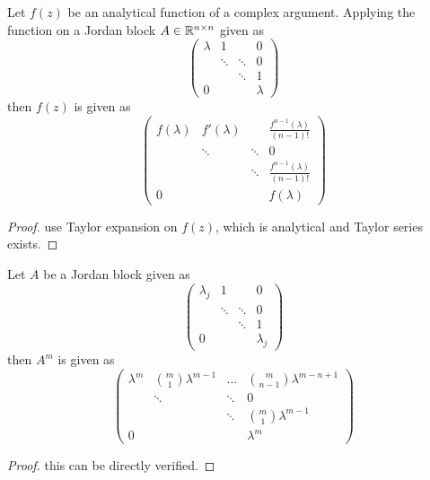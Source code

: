 \begin{refsection}
\begin{lemma}
\cite{wiki:matrixfunction}\cite[600]{meyer2000matrix} Let $f(z)$ be an analytical function of a complex argument. Applying the function on a Jordan block $A\in \mathbb{R}^{n\times n}$ given as
$$
\begin{pmatrix}
\lambda & 1 & ~ & 0\\
~ & \ddots & \ddots & 0 \\
~ & ~ & \ddots & 1 \\
0 & ~ & ~ & \lambda
\end{pmatrix}$$
then $f(z)$ is given as
$$
\begin{pmatrix}
f(\lambda) & f'(\lambda) & ~ & \frac{f^{n-1}(\lambda)}{(n-1)!}\\
~ & \ddots & \ddots & 0 \\
~ & ~ & \ddots & \frac{f^{n-1}(\lambda)}{(n-1)!} \\
0 & ~ & ~ & f(\lambda)
\end{pmatrix}$$
\end{lemma}
\begin{proof}
use Taylor expansion on $f(z)$, which is analytical and Taylor series exists. 
\end{proof}
 



\begin{lemma}
Let $A$ be a Jordan block given as
$$
\begin{pmatrix}
\lambda_j & 1 & ~ & 0\\
~ & \ddots & \ddots & 0 \\
~ & ~ & \ddots & 1 \\
0 & ~ & ~ & \lambda_j
\end{pmatrix}$$
then $A^m$ is given as
$$
\begin{pmatrix}
\lambda^m & \binom{m}{1}\lambda^{m-1} & \dots & \binom{m}{n-1}\lambda^{m-n+1}\\
~ & \ddots & \ddots & 0 \\
~ & ~ & \ddots & \binom{m}{1}\lambda^{m-1} \\
0 & ~ & ~ & \lambda^m
\end{pmatrix}$$
\end{lemma}
\begin{proof}
this can be directly verified.
\end{proof}



\end{refsection}
